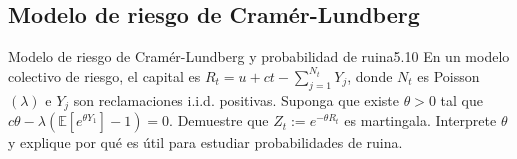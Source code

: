 \documentclass[10pt,a4paper]{article}
\begin{document}
\newpage
\subsection{Modelo de riesgo de Cramér-Lundberg}

\begin{ejercicio}{Modelo de riesgo de Cramér-Lundberg y probabilidad de ruina}{5.10}
    En un modelo colectivo de riesgo, el capital es $R_t = u + ct - \sum_{j=1}^{N_t} Y_j$, donde $N_t$ es Poisson$(\lambda)$ e $Y_j$ son reclamaciones i.i.d. positivas. Suponga que existe $\theta > 0$ tal que $c\theta - \lambda(\mathbb{E}[e^{\theta Y_1}] - 1) = 0$.
    Demuestre que $Z_t := e^{-\theta R_t}$ es martingala. Interprete $\theta$ y explique por qué es útil para estudiar probabilidades de ruina.
\end{ejercicio}
\end{document}
